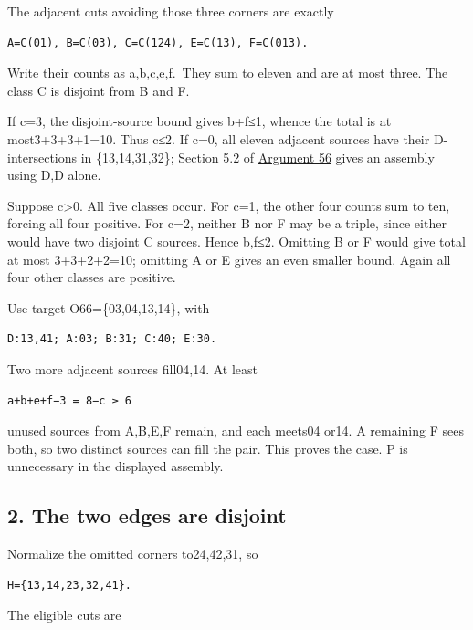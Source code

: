 \documentclass[
  10pt,
]{article}
\begin{document}
The adjacent cuts avoiding those three corners are exactly

\begin{verbatim}
A=C(01), B=C(03), C=C(124), E=C(13), F=C(013).
\end{verbatim}

Write their counts as a,b,c,e,f.~They sum to eleven and are at most
three. The class C is disjoint from B and F.

If c=3, the disjoint-source bound gives b+f≤1, whence the total is at
most3+3+3+1=10. Thus c≤2. If c=0, all eleven adjacent sources have their
D-intersections in \{13,14,31,32\}; Section 5.2 of
\protect\hyperlink{arg-56}{Argument 56} gives an assembly using D,D
alone.

Suppose c\textgreater0. All five classes occur. For c=1, the other four
counts sum to ten, forcing all four positive. For c=2, neither B nor F
may be a triple, since either would have two disjoint C sources. Hence
b,f≤2. Omitting B or F would give total at most 3+3+2+2=10; omitting A
or E gives an even smaller bound. Again all four other classes are
positive.

Use target O66=\{03,04,13,14\}, with

\begin{verbatim}
D:13,41; A:03; B:31; C:40; E:30.
\end{verbatim}

Two more adjacent sources fill04,14. At least

\begin{verbatim}
a+b+e+f−3 = 8−c ≥ 6
\end{verbatim}

unused sources from A,B,E,F remain, and each meets04 or14. A remaining F
sees both, so two distinct sources can fill the pair. This proves the
case. P is unnecessary in the displayed assembly.

\hypertarget{the-two-edges-are-disjoint}{%
\subsection*{2. The two edges are
disjoint}\label{the-two-edges-are-disjoint}}

Normalize the omitted corners to24,42,31, so

\begin{verbatim}
H={13,14,23,32,41}.
\end{verbatim}

The eligible cuts are
\end{document}
